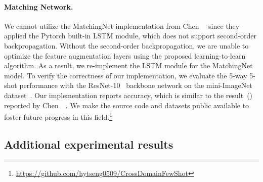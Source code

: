 \paragraph{Matching Network.}
We cannot utilize the MatchingNet implementation from Chen~\etal~\citep{chen2019closerfewshot} since they applied the Pytorch built-in LSTM module, which does not support second-order backpropagation.
Without the second-order backpropagation, we are unable to optimize the feature augmentation layers using the proposed learning-to-learn algorithm.
As a result, we re-implement the LSTM module for the MatchingNet model.
To verify the correctness of our implementation, we evaluate the 5-way 5-shot performance with the ResNet-10~\citep{he2016deep} backbone network on the mini-ImageNet dataset~\citep{ravi2017metalstm}.
Our implementation reports  accuracy, which is similar to the result~(\ie ) reported by Chen~\etal~\citep{chen2019closerfewshot}.
We make the source code and datasets public available to foster future progress in this field.\footnote{\url{https://github.com/hytseng0509/CrossDomainFewShot}}

\subsection{Additional experimental results}

